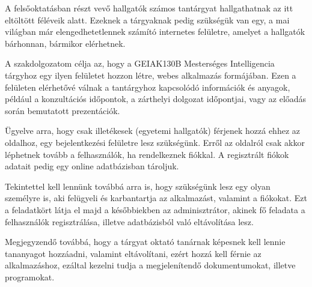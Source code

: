 
A felsőoktatásban részt vevő hallgatók számos tantárgyat hallgathatnak az itt eltöltött féléveik alatt. Ezeknek a tárgyaknak pedig szükségük van egy, a mai világban már elengedhetetlennek számító internetes felületre, amelyet a hallgatók bárhonnan, bármikor elérhetnek.

A szakdolgozatom célja az, hogy a GEIAK130B Mesterséges Intelligencia tárgyhoz egy ilyen felületet hozzon létre, webes alkalmazás formájában. Ezen a felületen elérhetővé válnak a tantárgyhoz kapcsolódó információk és anyagok, például a konzultációs időpontok, a zárthelyi dolgozat időpontjai, vagy az előadás során bemutatott prezentációk.

Ügyelve arra, hogy csak illetékesek (egyetemi hallgatók) férjenek hozzá ehhez az oldalhoz, egy bejelentkezési felületre lesz szükségünk. Erről az oldalról csak akkor léphetnek tovább a felhasználók, ha rendelkeznek fiókkal. A regisztrált fiókok adatait pedig egy online adatbázisban tároljuk.

Tekintettel kell lennünk továbbá arra is, hogy szükségünk lesz egy olyan személyre is, aki felügyeli és karbantartja az alkalmazást, valamint a fiókokat. Ezt a feladatkört látja el majd a későbbiekben az adminisztrátor, akinek fő feladata a felhasználók regisztrálása, illetve adatbázisból való eltávolítása lesz. 

Megjegyzendő továbbá, hogy a tárgyat oktató tanárnak képesnek kell lennie tananyagot hozzáadni, valamint eltávolítani, ezért hozzá kell férnie az alkalmazáshoz, ezáltal kezelni tudja a megjelenítendő dokumentumokat, illetve programokat.